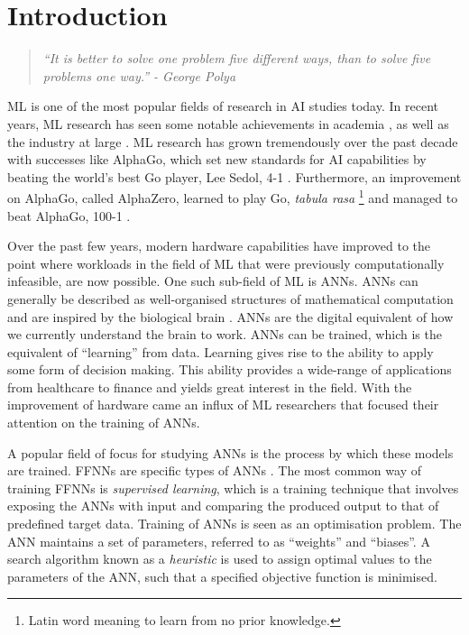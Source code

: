 \chapter{Introduction}\label{chap:introduction}

\begin{quotation}
      \textit{``It is better to solve one problem five different ways, than to solve five problems one way.'' - George Polya}
\end{quotation}


\Ac{ML} is one of the most popular fields of research in \ac{AI} studies today. In recent years, \ac{ML} research has seen some notable achievements in academia \cite{ref:lecun:2015, ref:glorot:2010, ref:goodfellow:2014, ref:quoc:2017}, as well as the industry at large \cite{ref:silver:2016, ref:silver:2017, ref:zoph:2017, ref:lewis:2017}.  \ac{ML} research has grown tremendously over the past decade with successes like AlphaGo, which set new standards for \ac{AI} capabilities by beating the world's best Go player, Lee Sedol, 4-1 \cite{ref:san-hun:2016}.  Furthermore, an improvement on AlphaGo, called AlphaZero, learned to play Go, \textit{tabula rasa} \footnote{Latin word meaning to learn from no prior knowledge.} and managed to beat AlphaGo, 100-1 \cite{ref:silver:2017}.

Over the past few years, modern hardware capabilities have improved to the point where workloads in the field of \ac{ML} that were previously computationally infeasible, are now possible. One such sub-field of \ac{ML} is \acp{ANN}. \acp{ANN} can generally be described as well-organised structures of mathematical computation and are inspired by the biological brain \cite{ref:engelbrecht:2007}. \acp{ANN} are the digital equivalent of how we currently understand the brain to work. \acp{ANN} can be trained, which is the equivalent of ``learning'' from data. Learning gives rise to the ability to apply some form of decision making. This ability provides a wide-range of applications from healthcare to finance and yields great interest in the field. With the improvement of hardware came an influx of \ac{ML} researchers that focused their attention on the training of \acp{ANN}.

A popular field of focus for studying \acp{ANN} is the process by which these models are trained. \Acfp{FFNN} are specific types of \acp{ANN} \cite{ref:reed:1999}. The most common way of training \acp{FFNN} is \textit{supervised learning}, which is a training technique that involves exposing the \acp{ANN} with input and comparing the produced output to that of predefined target data. Training of \acp{ANN} is seen as an optimisation problem. The \ac{ANN} maintains a set of parameters, referred to as ``weights'' and ``biases''. A search algorithm known as a \textit{heuristic} \cite{ref:pearl:1984} is used to assign optimal values to the parameters of the \ac{ANN}, such that a specified objective function is minimised.

